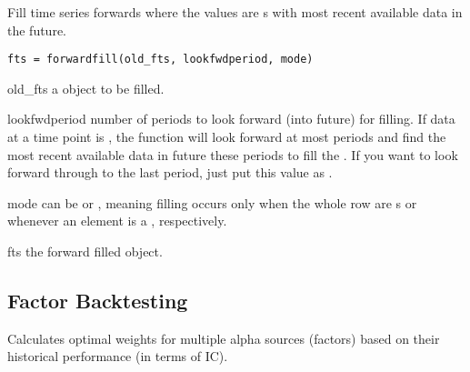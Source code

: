    Fill time series forwards where the values are s with most recent available data in 
   the future.

\usage
   \begin{lstlisting}[numbers=none]
    fts = forwardfill(old_fts, lookfwdperiod, mode)
   \end{lstlisting}

\inarg
   \begin{argdesc}
   \item [old\_fts]	  a \myfints{} object to be filled.
   \item [lookfwdperiod]   number of periods to look forward (into future) for filling.
         If data at a time point is , 
         the function will look forward 
         at most  periods
         and find the most recent available data in future these periods to fill the . 
         If you want to look forward through to the last period, 
         just put this value as .
   \item [mode] can be  or , 
         meaning filling occurs only when the whole row are s or
         whenever an element is a , respectively.
   \end{argdesc}

\outarg
   \begin{argdesc}
	\item [fts] the forward filled \myfints{} object.
   \end{argdesc}


\subsection{Factor Backtesting}

 Calculates optimal weights for multiple alpha sources (factors) based on their historical performance
(in terms of IC).

